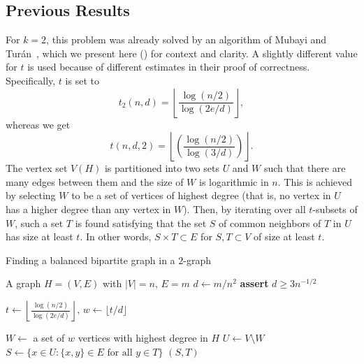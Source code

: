 \subsection{Previous Results}\label{subsec:previous-results}

For $k = 2$, this problem was already solved by an algorithm of Mubayi and Turán~\cite{MUBAYI2010174},
which we present here () for context and clarity.
A slightly different value for $t$ is used because of different estimates in their proof of correctness.
Specifically, $t$ is set to
\[
    t_2(n, d) = \left\lfloor \frac{\log (n/2) }{\log (2e/d)}\right\rfloor,
\]
whereas we get
\[
    t(n, d, 2) = \left\lfloor
        \left(  \frac{\log (n/2)}{\log (3/d)} \right)
       \right\rfloor.
\]
The vertex set $V(H)$ is partitioned into two sets $U$ and $W$ such that there are many edges between them
and the size of $W$ is logarithmic in $n$.
This is achieved by selecting $W$ to be a set of vertices of highest degree
(that is, no vertex in $U$ has a higher degree than any vertex in $W$).
Then, by iterating over all $t$-subsets of $W$, such a set $T$
is found satisfying that the set $S$ of common neighbors of $T$ in $U$ has size at least $t$.
In other words, $S \times T \subset E$ for $S, T \subset V$ of size at least $t$.

\begin{algorithm}[H]
    \caption{Finding a balanced bipartite graph in a $2$-graph}
    \label{alg:bipartite}
        \begin{algorithmic}[1]
        \Require A graph $H = (V, E)$ with $|V| = n$, $E = m$
        \State $d \gets m / n^2 $
        \State \textbf{assert} $d \geq 3 n^{-1/2}$ \label{line:bipartite_min_d}

        \State $t \gets \left\lfloor\frac{\log (n/2) }
        {\log (2e/d)}\right\rfloor,\, w \gets \lfloor t/d \rfloor$

        \State $W \gets $ a set of $w$ vertices with highest degree in $H$
        \State $U \gets V \setminus W$
         \label{line:2partite_for}
            \State $S \gets \{x \in U \colon \{x, y\} \in E \text{ for all } y \in T\}$
                \State \Return $(S, T)$
            \EndIf
        \EndFor
        \end{algorithmic}
\end{algorithm}

